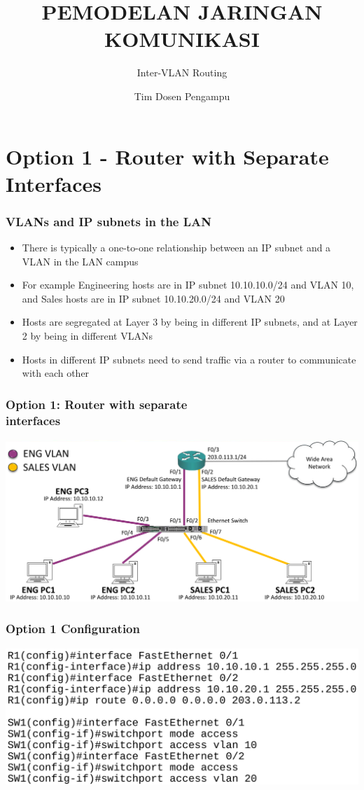 \documentclass[pdflatex,compress,mathserif]{beamer}
\title{PEMODELAN JARINGAN KOMUNIKASI}
\subtitle{Inter-VLAN Routing}
\author{Tim Dosen Pengampu}
\begin{document}
	
\maketitle

\section{Option 1 - Router with Separate Interfaces}

\begin{frame}
	\frametitle{VLANs and IP subnets in the LAN}
	\begin{itemize}
		\item There is typically a one-to-one relationship between an IP subnet and
a VLAN in the LAN campus
		\item For example Engineering hosts are in IP subnet 10.10.10.0/24 and
VLAN 10, and Sales hosts are in IP subnet 10.10.20.0/24 and VLAN 20
		\item Hosts are segregated at Layer 3 by being in different IP subnets, and at
Layer 2 by being in different VLANs
		\item Hosts in different IP subnets need to send traffic via a router to
communicate with each other
	\end{itemize}
\end{frame}

\begin{frame}
	\frametitle{Option 1: Router with separate\\ interfaces}
	\begin{center}
		\includegraphics[width=\linewidth]{img/img01}
	\end{center}
\end{frame}

\begin{frame}
	\frametitle{Option 1 Configuration}
	\begin{center}
		\includegraphics[width=\linewidth]{img/img02}
	\end{center}
\end{frame}
\end{document}
